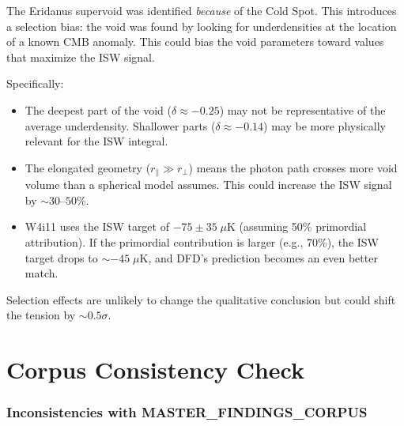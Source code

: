 \documentclass[11pt,a4paper]{article}
\begin{document}
The Eridanus supervoid was identified \emph{because} of the Cold Spot.
This introduces a selection bias: the void was found by looking for
underdensities at the location of a known CMB anomaly. This could
bias the void parameters toward values that maximize the ISW signal.

Specifically:
\begin{itemize}
\item The deepest part of the void ($\delta \approx -0.25$) may not
  be representative of the average underdensity. Shallower parts
  ($\delta \approx -0.14$) may be more physically relevant for the
  ISW integral.
\item The elongated geometry ($r_\parallel \gg r_\perp$) means the
  photon path crosses more void volume than a spherical model assumes.
  This could increase the ISW signal by $\sim 30$--$50\%$.
\item W4i11 uses the ISW target of $-75 \pm 35\;\mu$K (assuming 50\%
  primordial attribution). If the primordial contribution is
  larger (e.g., 70\%), the ISW target drops to $\sim -45\;\mu$K,
  and DFD's prediction becomes an even better match.
\end{itemize}

Selection effects are unlikely to change the qualitative conclusion
but could shift the tension by $\sim 0.5\sigma$.


\part{Corpus Consistency Check}
\label{part:corpus}


\section{Inconsistencies with MASTER\_FINDINGS\_CORPUS}
\label{sec:corpus-check}
\end{document}
